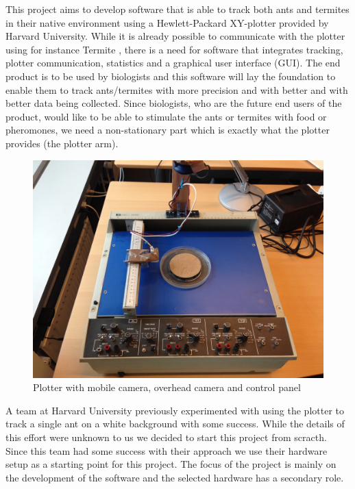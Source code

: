 This project aims to develop software that is able to track both ants and termites in their native environment using a Hewlett-Packard XY-plotter provided by Harvard University. While it is already possible to communicate with the plotter using for instance Termite \cite{termite}, there is a need for software that integrates tracking, plotter communication, statistics and a graphical user interface (GUI). The end product is to be used by biologists and this software will lay the foundation to enable them to track ants/termites with more precision and with better and with better data being collected. Since biologists, who are the future end users of the product, would like to be able to stimulate the ants or termites with food or pheromones, we need a non-stationary part which is exactly what the plotter provides (the plotter arm). 

\begin{figure}
        \centering
        \includegraphics[scale=0.125]{img/plotter}
        \caption{Plotter with mobile camera, overhead camera and control panel}
        \label{fig:plotter}
\end{figure}

A team at Harvard University previously experimented with using the plotter to track a single ant on a white background with some success. While the details of this effort were unknown to us we decided to start this project from scracth. Since this team had some success with their approach we use their hardware setup as a starting point for this project. The focus of the project is mainly on the development of the software and the selected hardware has a secondary role. \\

